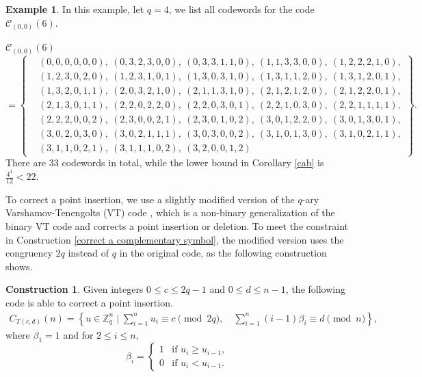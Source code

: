 \documentclass[pdflatex,sn-mathphys-num]{sn-jnl}
\theoremstyle{theorem}%
\theoremstyle{definition}
\newtheorem{example}{Example}
\theoremstyle{construction}
\newtheorem{construction}{Construction}
\newtheorem{open problem}{Open problem}
\begin{document}
\begin{example}
In this example, let $q=4$, we list all codewords for the code $\mathcal{C}_{(0,0)}(6)$.


	$\mathcal{C}_{(0,0)}(6)$ $$=
 \left\{
\begin{aligned}
	&(0, 0, 0, 0, 0, 0),\ (0, 3, 2, 3, 0, 0),\ (0, 3, 3, 1, 1, 0),\ (1, 1, 3, 3, 0, 0),\ (1, 2, 2, 2, 1, 0), \\
	&(1, 2, 3, 0, 2, 0),\ (1, 2, 3, 1, 0, 1),\ (1, 3, 0, 3, 1, 0),\ (1, 3, 1, 1, 2, 0),\ (1, 3, 1, 2, 0, 1), \\
	&(1, 3, 2, 0, 1, 1),\ (2, 0, 3, 2, 1, 0),\ (2, 1, 1, 3, 1, 0),\ (2, 1, 2, 1, 2, 0),\ (2, 1, 2, 2, 0, 1), \\
	&(2, 1, 3, 0, 1, 1),\ (2, 2, 0, 2, 2, 0),\ (2, 2, 0, 3, 0, 1),\ (2, 2, 1, 0, 3, 0),\ (2, 2, 1, 1, 1, 1), \\
	&(2, 2, 2, 0, 0, 2),\ (2, 3, 0, 0, 2, 1),\ (2, 3, 0, 1, 0, 2),\ (3, 0, 1, 2, 2, 0),\ (3, 0, 1, 3, 0, 1), \\
	&(3, 0, 2, 0, 3, 0),\ (3, 0, 2, 1, 1, 1),\ (3, 0, 3, 0, 0, 2),\ (3, 1, 0, 1, 3, 0),\ (3, 1, 0, 2, 1, 1), \\
	&(3, 1, 1, 0, 2, 1),\ (3, 1, 1, 1, 0, 2),\ (3, 2, 0, 0, 1, 2)
\end{aligned}
\right\}
.$$
There are $33$ codewords in total, while the lower bound in Corollary \ref{cab} is $\displaystyle\frac{4^4}{12}<22$.
\end{example}

To correct a point insertion, we use a slightly modified version of the $q$-ary Varshamov-Tenengolts (VT) code \cite{Tenengolts1984}, which is a non-binary generalization of the binary VT code \cite{vi} and corrects a point insertion or deletion. To meet the constraint in Construction \ref{correct a complementary symbol}, the modified version uses the congruency $2q$ instead of $q$ in the original code, as the following construction shows.
\begin{construction}\label{qVT}
Given integers $0\le c \le 2q-1$ and $0\le d \le n-1$, the following code is able to correct a point insertion.
\begin{align}
	C_{T(c,d)}(n) = \left \{ u\in \mathbb{Z}_{q}^{n}\mid\sum_{i=1}^{n}u_{i} \equiv c\pmod {2q} ,\quad \sum_{i=1}^{n}(i-1)\beta _{i} \equiv d\pmod{n}  \right \} ,
\end{align}
where $\beta_{1}=1$ and for $2 \le i \le n$, \[
\beta_{i} = 
\begin{cases} 
	1 & \text{if } u_{i} \geq u_{i-1}, \\ 
	0 & \text{if } u_{i} < u_{i-1}. 
\end{cases}
\]
\end{construction}
\end{document}
